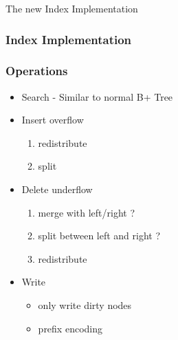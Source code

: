 \documentclass{beamer}
\begin{document}
  \begin{section}{The new Index Implementation}
    \begin{frame}
        \frametitle{Index Implementation}
        \begin{figure}
        \centering
        \end{figure}
    \end{frame}

    \begin{frame}
        \frametitle{Operations}
        \begin{itemize}
        \item Search - Similar to normal B+ Tree
        \pause
        \item Insert overflow
            \begin{enumerate}
            \item redistribute
            \item split 
            \end{enumerate}
        \pause
        \item Delete underflow
            \begin{enumerate}
            \item merge with left/right ?
            \item split between left and right ?
            \item redistribute
            \end{enumerate}
        \pause
        \item Write
            \begin{itemize}
              \item only write dirty nodes
              \item prefix encoding
            \end{itemize}
        \end{itemize}
    \end{frame}
  \end{section}
\end{document}
